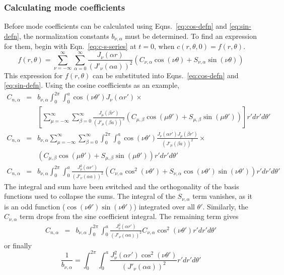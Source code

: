 \subsubsection{Calculating mode coefficients}
\label{sec:calcCoeffs}

Before mode coefficients can be calculated using Eqns.~\ref{eq:cos-defn} and \ref{eq:sin-defn}, the normalization constants $b_{\nu,\alpha}$ must be determined.  To find an expression for them, begin with Eqn.~\ref{eq:c-s-series} at $t=0$, when $c(r,\theta,0) = f(r,\theta)$.
\begin{equation}
f(r,\theta)= \sum_{\nu=-\infty}^{\infty} \sum_{\alpha = 0}^\infty   \frac{J_\nu\left(\alpha r\right)}{\left(J'_\nu (\alpha a)\right)^2} \left(C_{\nu,\alpha}\cos(\nu\theta) + S_{\nu,\alpha} \sin(\nu\theta)\right)
\label{eq:c-s-series-t-0}
\end{equation}
This expression for $f(r,\theta)$ can be substituted into Eqns.~\ref{eq:cos-defn} and \ref{eq:sin-defn}.  Using the cosine coefficients as an example,
\begin{eqnarray*}
C_{n,\alpha} & = &b_{\nu,\alpha} \int_0^{2\pi} \int_0^a \cos\left(\nu\theta'\right) J_\nu(\alpha r') \times\\
& &\left[\sum_{\mu=-\infty}^{\infty} \sum_{\beta = 0}^\infty   \frac{J_\mu\left(\beta r'\right)}{\left(J'_\mu (\beta a)\right)^2} \left(C_{\mu,\beta}\cos(\mu\theta') + S_{\mu,\beta} \sin(\mu\theta')\right)\right] r' dr' d\theta'\\
C_{n,\alpha} & = &b_{\nu,\alpha} \sum_{\mu=-\infty}^{\infty} \sum_{\beta = 0}^\infty\int_0^{2\pi} \int_0^a \cos\left(\nu\theta'\right)  \frac{ J_\nu(\alpha r')   J_\mu\left(\beta r'\right)}{\left(J'_\mu (\beta a)\right)^2} \times\\
& & \left(C_{\mu,\beta}\cos(\mu\theta') + S_{\mu,\beta} \sin(\mu\theta')\right) r' dr' d\theta'\\
C_{n,\alpha} & = &b_{\nu,\alpha} \int_0^{2\pi} \int_0^a  \frac{ J_\nu^2(\alpha r')}{\left(J'_\nu (\alpha a)\right)^2} \left(C_{\nu,\alpha}\cos^2(\nu\theta') + S_{\nu,\alpha}\cos\left(\nu\theta'\right)\sin(\nu\theta')\right) r' dr' d\theta'
\end{eqnarray*}
The integral and sum have been switched and the orthogonality of the basis functions used to collapse the sums.  The integral of the $S_{\nu,\alpha}$ term vanishes, as it is an odd function ($\cos\left(\nu\theta'\right)\sin(\nu\theta')$) integrated over all $\theta'$.  Similarly, the $C_{\nu,\alpha}$ term drops from the sine coefficient integral.  The remaining term gives
\begin{eqnarray*}
C_{n,\alpha} & = &b_{\nu,\alpha} \int_0^{2\pi} \int_0^a  \frac{ J_\nu^2(\alpha r')}{\left(J'_\nu (\alpha a)\right)^2} C_{\nu,\alpha}\cos^2(\nu\theta') r' dr' d\theta'
\end{eqnarray*} or finally
\begin{equation}
\frac{1}{b_{\nu,\alpha}}  =  \int_0^{2\pi} \int_0^a  \frac{ J_\nu^2(\alpha r')\cos^2(\nu\theta') }{\left(J'_\nu (\alpha a)\right)^2} r' dr' d\theta' \label{eq:bna-theory}
\end{equation}

